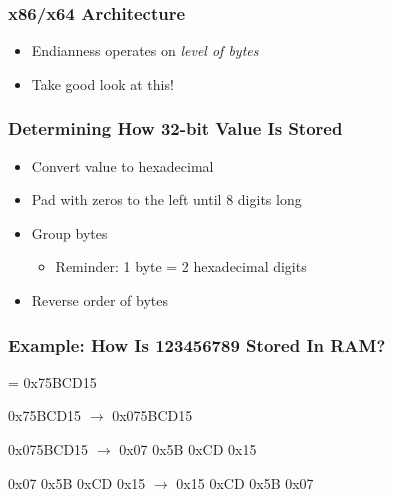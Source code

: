 \begin{frame}
  \frametitle{x86/x64 Architecture}
  \begin{itemize}
    \item Endianness operates on \emph{level of bytes}
    \item Take good look at this!
  \end{itemize}
  \begin{center}
  \end{center}
\end{frame}

\begin{frame}
  \frametitle{Determining How 32-bit Value Is Stored}
  \begin{itemize}
    \item Convert value to hexadecimal
    \item Pad with zeros to the left until 8 digits long
    \item Group bytes
          \begin{itemize}
            \item Reminder: 1 byte = 2 hexadecimal digits
          \end{itemize}
    \item Reverse order of bytes
  \end{itemize}
\end{frame}

\begin{frame}
  \frametitle{Example: How Is 123456789 Stored In RAM?}
    \begin{center}  = 0x75BCD15
    \end{center}

    \begin{center} \ttfamily
      0x75BCD15 $\rightarrow$ 0x075BCD15
    \end{center}

    \begin{center} \ttfamily
      0x075BCD15 $\rightarrow$ 0x07 0x5B 0xCD 0x15
    \end{center}

    \begin{center} \ttfamily
      0x07 0x5B 0xCD 0x15 $\rightarrow$ 0x15 0xCD 0x5B 0x07
    \end{center}
\end{frame}


